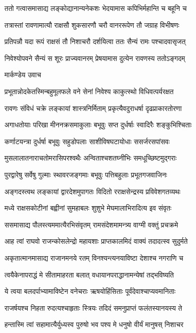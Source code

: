 \twolineshloka
{ततो गत्वासमासाद्य लङ्कोद्यानान्यनेकशः}
{भेदयामास कपिभिर्महान्ति च बहूनि च}


\twolineshloka
{तत्रास्तां रावणामात्यौ राक्षसौ शुकसारणौ}
{चरौ वानररूपेण तौ जग्राह विभीषणः}


\twolineshloka
{प्रतिपन्नौ यदा रूपं राक्षसं तौ निशाचरौ}
{दर्शयित्वा ततः सैन्यं रामः पश्चादवासृजत्}


\twolineshloka
{निवेश्योपवने सैन्यं स शूरः प्राज्यवानरम्}
{प्रेषयामास दुत्येन रावणस्य ततोऽङ्गदम्}


\twolineshloka
{मार्कण्डेय उवाच}
{}


\twolineshloka
{प्रभूतान्नोदकेतस्मिन्बहुमूलफले वने}
{सेनां निवेश्य काकुत्स्थो विधिवत्पर्यरक्षत}


\twolineshloka
{रावणः संविधं चक्रे लङ्कायां शास्त्रनिर्मिताम्}
{प्रकृत्यैवदुराधर्षा दृढप्राकारतोरणा}


\twolineshloka
{अगाधतोयाः परिखा मीननक्रसमाकुलाः}
{बभूवुः सप्त दुर्धर्षाः स्वादिरैः शङ्कुभिश्चिताः}


\twolineshloka
{कर्णाटयन्त्रा दुर्धर्षा बभूवुः सहुडोपलाः}
{साशीविषघटायोधाः ससर्जरसपांसवः}


\twolineshloka
{मुसलालातनाराचतोमरासिपरश्वथैः}
{अन्विताश्चशतघ्नीभिः समधूच्छिष्टमुद्गराः}


\twolineshloka
{पुरद्वारेषु सर्वेषु गुल्माः स्थावरजङ्गमाः}
{बभूवुः पत्तिबहुलाः प्रभूतगजवाजिनः}


\twolineshloka
{अङ्गदस्त्वथ लङ्कायां द्वारदेशमुपागतः}
{विदितो रराक्षसेन्द्रस्य प्रविवेशगतव्यथः}


\twolineshloka
{मध्ये राक्षसकोटीनां बह्वीनां सुमहाबलः}
{शुशुभे मेघमालाभिरादित्य इव संवृतः}


\twolineshloka
{ससमासाद्य पौलस्त्यममात्यैरभिसंवृतम्}
{रामसंदेशमामन्त्र्य वाग्मी वक्तुं प्रचक्रमे}


\threelineshloka
{आह त्वां राघवो राजन्कोसलेन्द्रो महायशाः}
{प्राप्तकालमिदं वाक्यं तदादत्स्व सुदुर्मते}
{}


\twolineshloka
{अकृतात्मानमासाद्य राजानमनये रतम्}
{विनश्यन्त्यनयाविष्टा देशाश्च नगराणि च}


\twolineshloka
{त्वयैकेनापराद्धं मे सीतामाहरता बलात्}
{वधायानपराद्धानामन्येषां तद्भविष्यति}


\twolineshloka
{ये त्वया बलदर्पाभ्यामाविष्टेन वनेचराः}
{ऋषयोहिंसिताः पूर्वंदेवाश्चाप्यवमानिताः}


\twolineshloka
{राजर्षयश्च निहता रुदत्यश्चाहृताः स्त्रियः}
{तदिदं समनुप्राप्तं फलंतस्यानयस्य ते}


\twolineshloka
{हन्तास्मि त्वां सहामात्यैर्युध्यस्व पुरुषो भव}
{पश्य मे धनुषो वीर्यं मानुषस् निशाचर}


